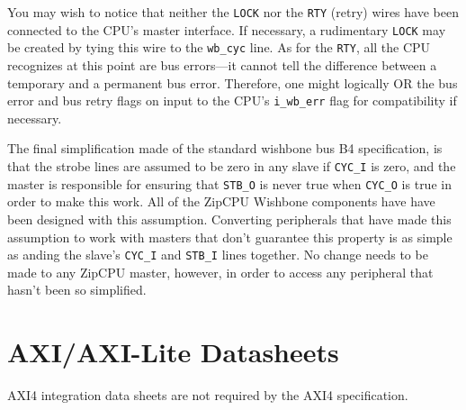 \documentclass{gqtekspec}
\begin{document}
You may wish to notice that neither the {\tt LOCK} nor the {\tt RTY} (retry)
wires have been connected to the CPU's master interface.  If necessary, a
rudimentary {\tt LOCK} may be created by tying this wire to the {\tt wb\_cyc}
line.  As for the {\tt RTY}, all the CPU recognizes at this point are bus
errors---it cannot tell the difference between a temporary and a permanent bus
error.  Therefore, one might logically OR the bus error and bus retry flags on
input to the CPU's {\tt i\_wb\_err} flag for compatibility if necessary.

The final simplification made of the standard wishbone bus B4 specification, is
that the strobe lines are assumed to be zero in any slave if {\tt CYC\_I} is
zero, and the master is responsible for ensuring that {\tt STB\_O} is never
true when {\tt CYC\_O} is true in order to make this work.  All of the ZipCPU
Wishbone components have have been designed with this assumption.
Converting peripherals that have made this assumption to work with masters
that don't guarantee this property is as simple as anding the slave's
{\tt CYC\_I} and {\tt STB\_I} lines together.  No change needs to be made to
any ZipCPU master, however, in order to access any peripheral that hasn't been
so simplified.
\section{AXI/AXI-Lite Datasheets}\label{sec:axi}
AXI4 integration data sheets are not required by the AXI4 specification.

\end{document}
